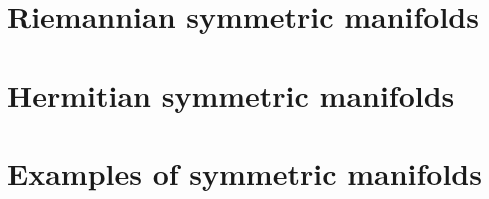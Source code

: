 \documentclass[twoside]{article}
\begin{document}


\section{Riemannian symmetric manifolds}



\section{Hermitian symmetric manifolds}



\section{Examples of symmetric manifolds}



\printbibliography
\end{document}
